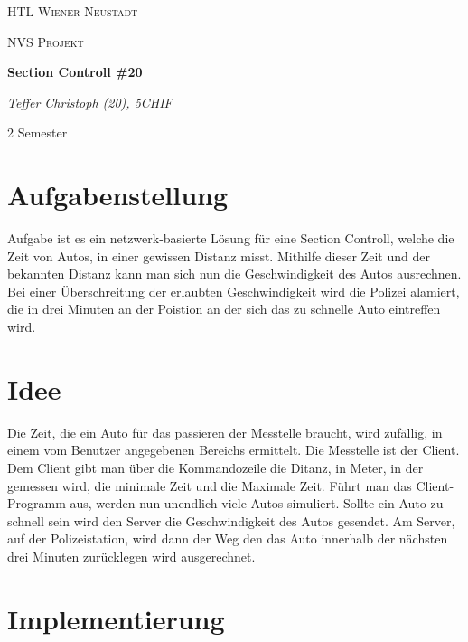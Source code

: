 \documentclass[12pt,a4paper]{scrartcl}
\begin{document}
\begin{titlepage}
	\centering
	{\scshape\LARGE HTL Wiener Neustadt \par}
	\vspace{1cm}
	{\scshape\Large NVS Projekt\par}
	\vspace{1.5cm}
	{\huge\bfseries Section Controll \#20\par}
	\vspace{2cm}
	{\Large\itshape Teffer Christoph (20), 5CHIF\par}
	\vfill
	\vfill

	{2 Semester}
\end{titlepage}

\tableofcontents
\newpage

\section{Aufgabenstellung}
\label{sec:Aufgabenstellung}

Aufgabe ist es ein netzwerk-basierte Lösung für eine Section Controll, 
welche die Zeit von Autos, in einer gewissen Distanz misst. Mithilfe dieser 
Zeit und der bekannten Distanz kann man sich nun die Geschwindigkeit des Autos
ausrechnen. Bei einer Überschreitung der erlaubten Geschwindigkeit wird die Polizei
alamiert, die in drei Minuten an der Poistion an der sich das zu schnelle Auto eintreffen wird.

\section{Idee}
\label{sec:Idee}

Die Zeit, die ein Auto für das passieren der Messtelle braucht, wird zufällig, 
in einem vom Benutzer angegebenen Bereichs ermittelt.
Die Messtelle ist der Client. Dem Client gibt man über die Kommandozeile
die Ditanz, in Meter, in der gemessen wird, die minimale Zeit und die Maximale Zeit.
Führt man das Client-Programm aus, werden nun unendlich viele Autos simuliert.
Sollte ein Auto zu schnell sein wird den Server die Geschwindigkeit des Autos gesendet.
Am Server, auf der Polizeistation, wird dann der Weg den das Auto innerhalb der nächsten drei Minuten zurücklegen wird
ausgerechnet. 

\section{Implementierung}
\label{sec:Implementierung}
\end{document}
